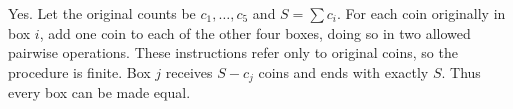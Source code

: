 Yes. Let the original counts be $c_1,\ldots,c_5$ and $S=\sum c_i$. For each coin originally in box $i$, add one coin to each of the other four boxes, doing so in two allowed pairwise operations. These instructions refer only to original coins, so the procedure is finite. Box $j$ receives $S-c_j$ coins and ends with exactly $S$. Thus every box can be made equal.
